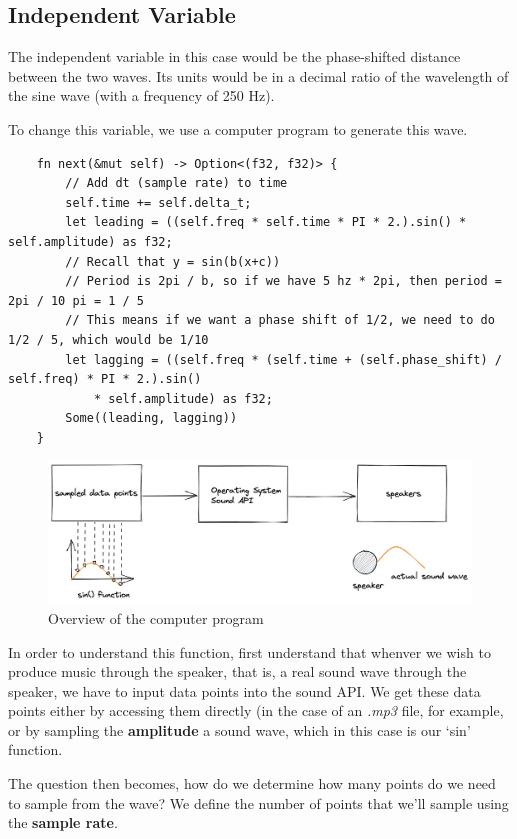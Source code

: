 \documentclass[index]{subfiles}
\begin{document}
\subsection{Independent Variable}

The independent variable in this case would be the phase-shifted distance between the two waves. Its units would be in a decimal ratio of the wavelength of the sine wave (with a frequency of 250 Hz).

To change this variable, we use a computer program to generate this wave.

\begin{verbatim}
    fn next(&mut self) -> Option<(f32, f32)> {
        // Add dt (sample rate) to time
        self.time += self.delta_t;
        let leading = ((self.freq * self.time * PI * 2.).sin() * self.amplitude) as f32;
        // Recall that y = sin(b(x+c))
        // Period is 2pi / b, so if we have 5 hz * 2pi, then period = 2pi / 10 pi = 1 / 5
        // This means if we want a phase shift of 1/2, we need to do 1/2 / 5, which would be 1/10
        let lagging = ((self.freq * (self.time + (self.phase_shift) / self.freq) * PI * 2.).sin()
            * self.amplitude) as f32;
        Some((leading, lagging))
    }
\end{verbatim}

\begin{figure}[H]
    \centering
    \includegraphics[scale=0.2]{layout.png}
    \caption{Overview of the computer program}
\end{figure}

In order to understand this function, first understand that whenver we wish to produce music through the speaker, that is, a real sound wave through the speaker, we have to input data points into the sound API. We get these data points either by accessing them directly (in the case of an \textit{.mp3} file, for example, or by sampling the \textbf{amplitude} a sound wave, which in this case is our `sin' function.

The question then becomes, how do we determine how many points do we need to sample from the wave? We define the number of points that we'll sample using the \textbf{sample rate}.
\end{document}
